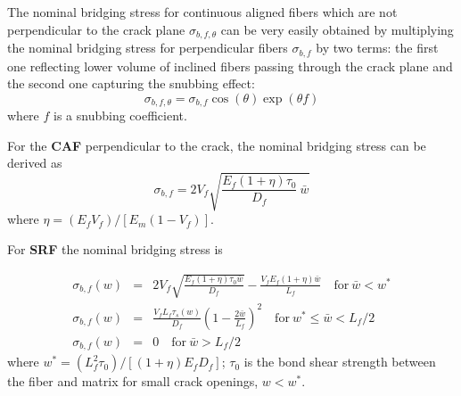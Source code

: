 \documentclass[a4paper]{article}
\begin{document}
The nominal bridging stress for continuous aligned fibers which are not perpendicular to the crack plane $\sigma_{b,f,\theta}$ can be very easily obtained by multiplying the nominal bridging stress for perpendicular fibers $\sigma_{b,f}$ by two terms: the first one reflecting lower volume of inclined fibers passing through the crack plane and the second one capturing the snubbing effect:
%
\begin{equation}
\sigma_{b,f,\theta} = \sigma_{b,f} \cos(\theta) \exp(\theta f)
\end{equation}
%
where $f$ is a snubbing coefficient.

For the \textbf{CAF} perpendicular to the crack, the nominal bridging stress can be derived as
%
\begin{equation}
  \sigma_{b,f} = 2 V_f \sqrt{ \frac{ E_f (1+\eta) \tau_0 } {D_f} \: \bar{w} }
\end{equation}
%
where $\eta = (E_f V_f)/[E_m (1 - V_f)]$.

For \textbf{SRF} the nominal bridging stress is 

\begin{eqnarray}
\sigma_{b,f}(w) &=& 2 V_f \sqrt{ \frac{E_f (1+\eta) \tau_0 \bar{w}}{D_f} } - \frac{V_f E_f (1+\eta) \bar{w} }{L_f}  \quad \mathrm{for} \: \bar{w} < w^* \\
\sigma_{b,f}(w) &=& \frac{V_f L_f \tau_s(w)}{D_f} \left( 1- \frac{2 \bar{w}}{L_f} \right)^2 \quad \mathrm{for} \: w^* \leq \bar{w} < L_f/2 \\
\sigma_{b,f}(w) &=& 0 \quad \mathrm{for} \: \bar{w} > L_f/2 
\end{eqnarray}
where $w^* = \left(L_f^2 \tau_0 \right)/[(1+\eta) E_f D_f]$; $\tau_0$ is the bond shear strength between the fiber and matrix for small crack openings, $w<w^\ast$.
\end{document}
